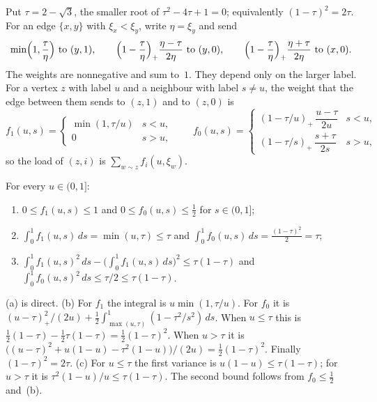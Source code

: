 Put $\tau=2-\sqrt3$, the smaller root of $\tau^2-4\tau+1=0$; equivalently $(1-\tau)^2=2\tau$. For an edge $\{x,y\}$ with
$\xi_x<\xi_y$, write $\eta=\xi_y$ and send
\[
  \min\Bigl(1,\frac\tau\eta\Bigr)\ \text{to}\ (y,1),\qquad
  \Bigl(1-\frac\tau\eta\Bigr)_+\frac{\eta-\tau}{2\eta}\ \text{to}\ (y,0),\qquad
  \Bigl(1-\frac\tau\eta\Bigr)_+\frac{\eta+\tau}{2\eta}\ \text{to}\ (x,0).
\]
The weights are nonnegative and sum to~$1$. They depend only on the larger label. For a vertex $z$ with label $u$ and a
neighbour with label $s\ne u$, the weight that the edge between them sends to $(z,1)$ and to $(z,0)$ is
\[
  f_1(u,s)=\begin{cases}\min(1,\tau/u)&s<u,\\0&s>u,\end{cases}\qquad
  f_0(u,s)=\begin{cases}(1-\tau/u)_+\,\dfrac{u-\tau}{2u}&s<u,\\[1ex](1-\tau/s)_+\,\dfrac{s+\tau}{2s}&s>u,\end{cases}
\]
so the load of $(z,i)$ is $\sum_{w\sim z}f_i(u,\xi_w)$.

\begin{lemma}\label{lem:fluid}
For every $u\in(0,1]$:
\begin{enumerate}[label=(\alph*)]
\item $0\le f_1(u,s)\le1$ and $0\le f_0(u,s)\le\frac12$ for $s\in(0,1]$;
\item $\int_0^1f_1(u,s)\,ds=\min(u,\tau)\le\tau$ and $\int_0^1f_0(u,s)\,ds=\frac{(1-\tau)^2}2=\tau$;
\item $\int_0^1f_1(u,s)^2\,ds-\bigl(\int_0^1f_1(u,s)\,ds\bigr)^2\le\tau(1-\tau)$ and
$\int_0^1f_0(u,s)^2\,ds\le\tau/2\le\tau(1-\tau)$.
\end{enumerate}
\end{lemma}
\begin{outline}
(a) is direct. (b) For $f_1$ the integral is $u\min(1,\tau/u)$. For $f_0$ it is
$(u-\tau)_+^2/(2u)+\frac12\int_{\max(u,\tau)}^1(1-\tau^2/s^2)\,ds$. When $u\le\tau$ this is
$\frac12(1-\tau)-\frac12\tau(1-\tau)=\frac12(1-\tau)^2$. When $u>\tau$ it is
$\bigl((u-\tau)^2+u(1-u)-\tau^2(1-u)\bigr)/(2u)=\frac12(1-\tau)^2$. Finally $(1-\tau)^2=2\tau$. (c) For $u\le\tau$ the
first variance is $u(1-u)\le\tau(1-\tau)$; for $u>\tau$ it is $\tau^2(1-u)/u\le\tau(1-\tau)$. The second bound follows
from $f_0\le\frac12$ and~(b).
\end{outline}

